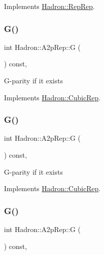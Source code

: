 Implements \mbox{\hyperlink{structHadron_1_1RepRep_a92c8802e5ed7afd7da43ccfd5b7cd92b}{Hadron\+::\+Rep\+Rep}}.

\mbox{\label{structHadron_1_1A2pRep_a19c098bbb0fcc9aa899231883f4b4ae0}} 
\subsubsection{\texorpdfstring{G()}{G()}\hspace{0.1cm}{\footnotesize\ttfamily [1/3]}}
{\footnotesize\ttfamily int Hadron\+::\+A2p\+Rep\+::G (\begin{DoxyParamCaption}{ }\end{DoxyParamCaption}) const\hspace{0.3cm}{\ttfamily [inline]}, {\ttfamily [virtual]}}

G-\/parity if it exists 

Implements \mbox{\hyperlink{structHadron_1_1CubicRep_a52104e43266d1614c00bbd1c3b395458}{Hadron\+::\+Cubic\+Rep}}.

\mbox{\label{structHadron_1_1A2pRep_a19c098bbb0fcc9aa899231883f4b4ae0}} 
\subsubsection{\texorpdfstring{G()}{G()}\hspace{0.1cm}{\footnotesize\ttfamily [2/3]}}
{\footnotesize\ttfamily int Hadron\+::\+A2p\+Rep\+::G (\begin{DoxyParamCaption}{ }\end{DoxyParamCaption}) const\hspace{0.3cm}{\ttfamily [inline]}, {\ttfamily [virtual]}}

G-\/parity if it exists 

Implements \mbox{\hyperlink{structHadron_1_1CubicRep_a52104e43266d1614c00bbd1c3b395458}{Hadron\+::\+Cubic\+Rep}}.

\mbox{\label{structHadron_1_1A2pRep_a19c098bbb0fcc9aa899231883f4b4ae0}} 
\subsubsection{\texorpdfstring{G()}{G()}\hspace{0.1cm}{\footnotesize\ttfamily [3/3]}}
{\footnotesize\ttfamily int Hadron\+::\+A2p\+Rep\+::G (\begin{DoxyParamCaption}{ }\end{DoxyParamCaption}) const\hspace{0.3cm}{\ttfamily [inline]}, {\ttfamily [virtual]}}

